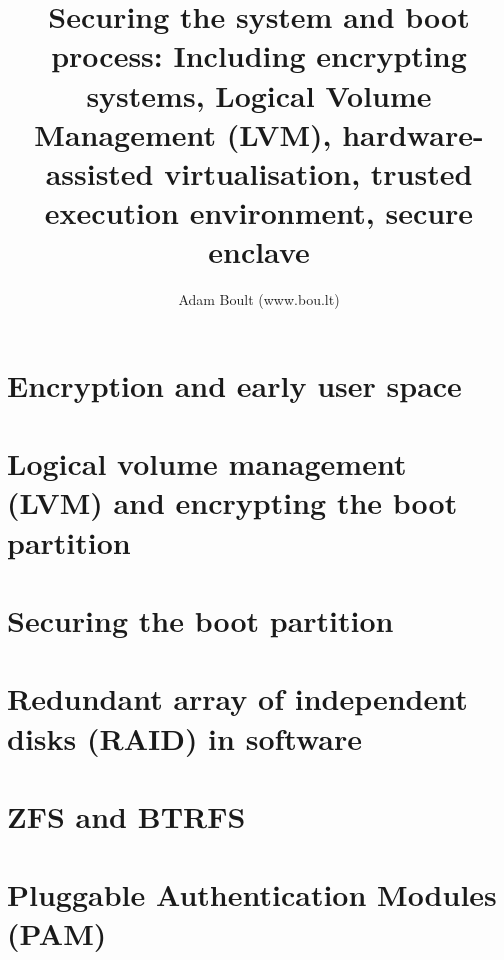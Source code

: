 \documentclass[oneside]{book}
\begin{document}
\author{Adam Boult (www.bou.lt)}
\title{Securing the system and boot process: Including encrypting systems, Logical Volume Management (LVM), hardware-assisted virtualisation, trusted execution environment, secure enclave}
\maketitle

\setcounter{tocdepth}{0}
\tableofcontents



\part{Encryption and early user space}




\part{Logical volume management (LVM) and encrypting the boot partition}


\part{Securing the boot partition}



\part{Redundant array of independent disks (RAID) in software}


\part{ZFS and BTRFS}



\part{Pluggable Authentication Modules (PAM)}

\end{document}
